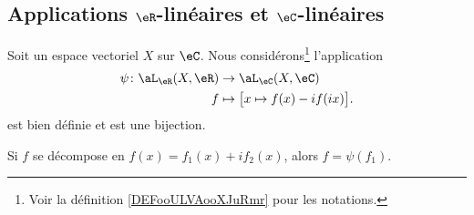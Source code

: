 \subsection{Applications \( \eR\)-linéaires et \( \eC\)-linéaires}

\begin{lemma}        \label{LEMooBZHIooSQJSnM}
    Soit un espace vectoriel \( X\) sur \( \eC\). Nous considérons\footnote{Voir la définition \ref{DEFooULVAooXJuRmr} pour les notations.} l'application
    \begin{equation}        \label{EQooLYYGooJfKIfu}
        \begin{aligned}
            \psi\colon \aL_{\eR}(X,\eR)&\to \aL_{\eC}(X,\eC) \\
            f&\mapsto \big[ x\mapsto f(x)-if(ix) \big]. 
        \end{aligned}
    \end{equation}
    est bien définie et est une bijection.

    Si \( f\) se décompose en \( f(x)=f_1(x)+if_2(x)\), alors \( f=\psi(f_1)\).
\end{lemma}

